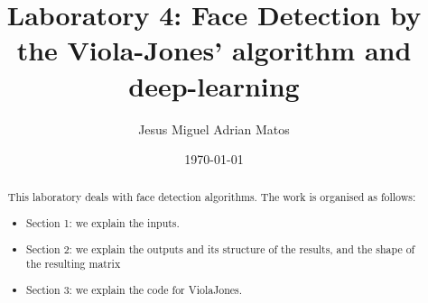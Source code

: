 \documentclass[]{article}
\title{Laboratory 4: Face Detection by the Viola-Jones' algorithm and deep-learning}
\author{Jesus Miguel Adrian Matos}
\date{\today}
\begin{document}
	\maketitle
	
	\begin{abstract}
		\noindent This laboratory deals with face detection algorithms. 		
\noindent The work is organised as follows:
\begin{itemize}
\item Section 1: we explain the inputs.
\item Section 2: we explain the outputs and its structure of the results, and the shape of the resulting matrix
\item Section 3: we explain the code for ViolaJones.
\end{itemize}
		
		
		
	\end{abstract}
	
	
	
	
	
	
		
\end{document}
